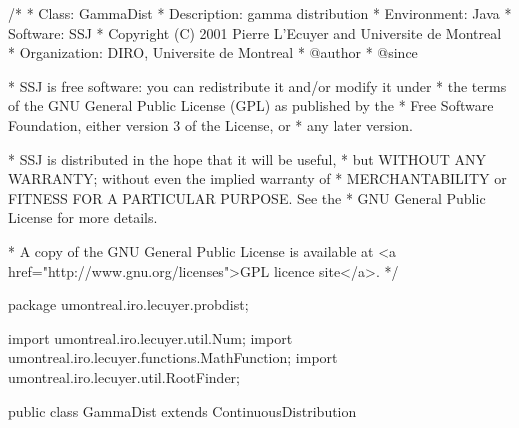 \begin{code}
\begin{hide}
/*
 * Class:        GammaDist
 * Description:  gamma distribution
 * Environment:  Java
 * Software:     SSJ
 * Copyright (C) 2001  Pierre L'Ecuyer and Universite de Montreal
 * Organization: DIRO, Universite de Montreal
 * @author
 * @since

 * SSJ is free software: you can redistribute it and/or modify it under
 * the terms of the GNU General Public License (GPL) as published by the
 * Free Software Foundation, either version 3 of the License, or
 * any later version.

 * SSJ is distributed in the hope that it will be useful,
 * but WITHOUT ANY WARRANTY; without even the implied warranty of
 * MERCHANTABILITY or FITNESS FOR A PARTICULAR PURPOSE.  See the
 * GNU General Public License for more details.

 * A copy of the GNU General Public License is available at
   <a href="http://www.gnu.org/licenses">GPL licence site</a>.
 */
\end{hide}
package umontreal.iro.lecuyer.probdist;
\begin{hide}
import umontreal.iro.lecuyer.util.Num;
import umontreal.iro.lecuyer.functions.MathFunction;
import umontreal.iro.lecuyer.util.RootFinder;
\end{hide}

public class GammaDist extends ContinuousDistribution\begin{hide} {
   private double alpha;
   private double lambda;
   private double logFactor;      // Log (lambda^alpha / Gamma (alpha))
   private static final double ALIM = 1.0E5;

   private static class Function implements MathFunction {
      // For MLE
      private int n;
      private double empiricalMean;
      private double sumLn;

      public Function (int n, double empiricalMean, double sumLn) {
         this.n = n;
         this.empiricalMean = empiricalMean;
         this.sumLn = sumLn;
      }

      public double evaluate (double x) {
         if (x <= 0.0) return 1.0e200;
         return (n * Math.log (empiricalMean / x) + n * Num.digamma (x) - sumLn);
      }
   }


   private static class myFunc implements MathFunction {
      // For inverseF
      protected int d;
      protected double alp, u;

      public myFunc (double alp, int d, double u) {
         this.alp = alp;
         this.d = d;
         this.u = u;
      }

      public double evaluate (double x) {
         return u - GammaDist.cdf(alp, d, x);
      }
   }


\end{hide}\end{code}
